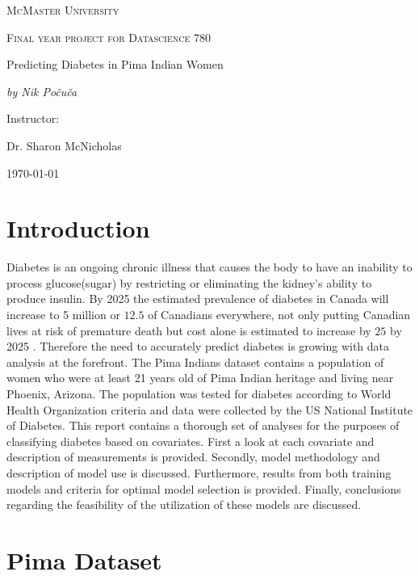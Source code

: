 \documentclass[11pt,letterpaper]{article}
\begin{document}
\begin{titlepage}
	\centering
	{\scshape\LARGE McMaster University \par}
	\vspace{1cm}
	{\scshape\Large Final year project for Datascience 780\par}
	\vspace{1.5cm}
	{\huge Predicting Diabetes in  Pima Indian Women \par}
	\vspace{2cm}
	{\Large\itshape by Nik Po\v cu\v ca\par}
	\vfill
	Instructor:  \par
	Dr. Sharon McNicholas 

	\vfill

	{\large \today\par}
\end{titlepage}

\doublespacing

\section{Introduction}

Diabetes is an ongoing chronic illness that causes the body to have an inability to process glucose(sugar) by restricting or eliminating the kidney's ability to produce insulin. 
By 2025 the estimated prevalence of diabetes in Canada will increase to 5 million or $12.5$ of Canadians everywhere, not only putting Canadian lives at risk of premature death but cost alone is estimated to increase by $25 $ by 2025 \citep{diabetes}. Therefore the need to accurately predict diabetes is growing with data analysis at the forefront. The Pima Indians dataset contains a population of women who were at least 21 years old of Pima Indian heritage and living near Phoenix, Arizona. The population was tested for diabetes according to World Health Organization criteria and data were collected by the US National Institute of Diabetes\citep{pima}. This report contains a thorough set of analyses for the purposes of classifying diabetes based on covariates. First a look at each covariate and description of measurements is provided. Secondly, model methodology and description of model use is discussed. Furthermore, results from both training models and criteria for optimal model selection is provided. Finally, conclusions regarding the feasibility of the utilization of these models are discussed. 

\section{Pima Dataset}
\end{document}
